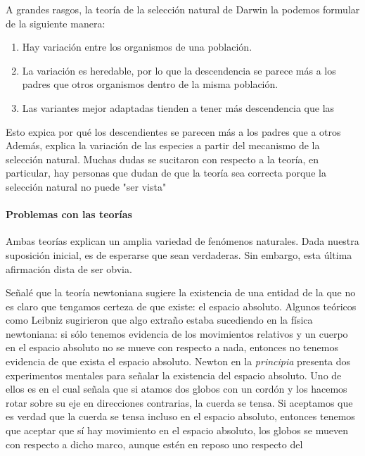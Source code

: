 {{{{A grandes rasgos, la teoría de la selección natural de Darwin la podemos formular de la siguiente manera:

\begin{enumerate}
    \item Hay variación entre los organismos de una población.
    \item La variación es heredable, por lo que la descendencia se parece más a los padres que otros organismos dentro de la misma población.
    \item Las variantes mejor adaptadas tienden a tener más descendencia que las %
\end{enumerate}



Esto expica por qué los descendientes se parecen más a los padres que a otros %
Además, explica la variación de las especies a partir del mecanismo de la selección natural.
Muchas dudas se sucitaron con respecto a la teoría, en particular, hay personas que dudan de que la teoría sea correcta porque la selección natural no puede "ser vista"

\paragraph{Problemas con las teorías}

Ambas teorías explican un amplia variedad de fenómenos naturales.
Dada nuestra suposición inicial, es de esperarse que sean verdaderas.
Sin embargo, esta última afirmación dista de ser obvia.

Señalé que la teoría newtoniana sugiere la existencia de una entidad de la que no es claro que tengamos certeza de que existe: el espacio absoluto.
Algunos teóricos como Leibniz sugirieron que algo extraño estaba sucediendo en la física newtoniana: si sólo tenemos evidencia de los movimientos relativos y un cuerpo en el espacio absoluto no se mueve con respecto a nada, entonces no tenemos evidencia de que exista el espacio absoluto.
Newton en la \emph{principia} presenta dos experimentos mentales para señalar la existencia del espacio absoluto.
Uno de ellos es en el cual señala que si atamos dos globos con un cordón y los hacemos rotar sobre su eje en direcciones contrarias, la cuerda se tensa.
Si aceptamos que es verdad que la cuerda se tensa incluso en el espacio absoluto, entonces tenemos que aceptar que sí hay movimiento en el espacio absoluto, los globos se mueven con respecto a dicho marco, aunque estén en reposo uno respecto del %

}}}}
